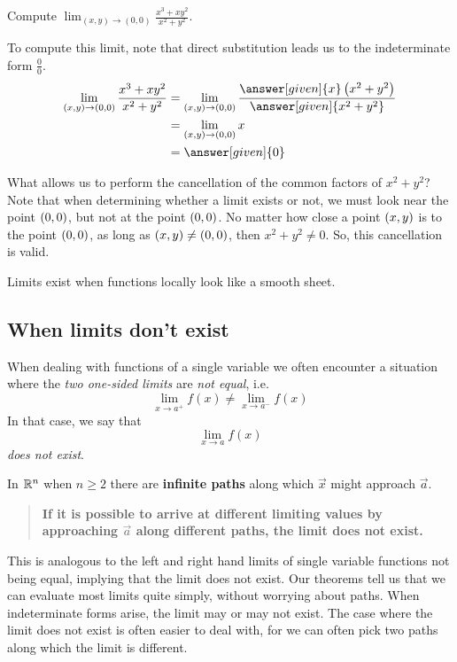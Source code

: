 \documentclass{ximera}
\begin{document}
\begin{example}
  Compute $\lim_{(x,y)\to(0,0)} \frac{x^3+xy^2}{x^2+y^2}$.
  \begin{explanation}
   To compute this limit, note that direct substitution leads us to the indeterminate form $\frac{0}{0}$.
    \begin{align*}
      \lim_{(x,y)\to(0,0)}\frac{x^3+xy^2}{x^2+y^2}
      &=\lim_{(x,y)\to(0,0)} \frac{\answer[given]{x}\left(x^2+y^2\right)}{\answer[given]{x^2+y^2}}\\
      &=\lim_{(x,y)\to(0,0)} x\\
      &=\answer[given]{0}
    \end{align*}

    What allows us to perform the cancellation of the common factors of $x^2+y^2$?  Note that when determining whether a limit exists or not, we must look near the point $\left(0,0\right)$, but not at the point $\left(0,0\right)$.  No matter how close a point  $\left(x,y\right)$ is to the point $\left(0,0\right)$, as long as  $\left(x,y\right) \neq \left(0,0\right)$, then $x^2+y^2 \neq 0$. So, this cancellation is valid.
  \end{explanation}
\end{example}



Limits exist when functions locally look like a smooth sheet.
\subsection{When limits don't exist}

When dealing with functions of a single variable we often encounter a situation where the \emph{two one-sided limits} are \emph{not equal}, i.e.
\[
\lim_{x\to a^+}f(x) \ne  \lim_{x\to a^-}f(x)
\]
In that case, we say that
\[
\lim_{x\to a}f(x)
\]
\emph{does not exist}.



In $\mathbb R^n$ when $n\ge2$ there are \textbf{infinite paths} along which
$\vec{x}$ might approach $\vec{a}$.

\begin{quote}
  \textbf{If it is possible to arrive at different limiting values by
    approaching $\vec{a}$ along different paths, the limit does not exist.}
\end{quote}
This is analogous to the left and right hand limits of single variable
functions not being equal, implying that the limit does not exist.
Our theorems tell us that we can evaluate most limits quite simply,
without worrying about paths. When indeterminate forms arise, the
limit may or may not exist.
 The case where the limit does not
exist is often easier to deal with, for we can often pick two paths
along which the limit is different.
\end{document}
